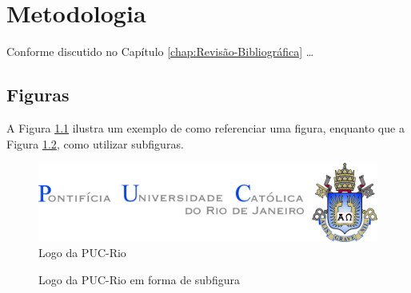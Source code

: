 

\chapter{Metodologia}
\label{chap:Metodologia}

Conforme discutido no Capítulo \ref{chap:Revisão-Bibliográfica} \ldots
\lipsum[1]
\section{Figuras}
\label{sec:Figuras}

A Figura \ref{fig:puc.png} ilustra um exemplo de como referenciar uma figura, 
enquanto que a Figura \ref{fig:puc2}, como utilizar subfiguras.

\begin{figure}[ht]
  \centering
  \includegraphics[scale=1.0]{figs/puc.png}
  \caption{Logo da PUC-Rio}
  \label{fig:puc.png}
 \end{figure}

\begin{figure}[ht]
  \centering
  \hspace{1cm}
  \caption{Logo da PUC-Rio em forma de subfigura}
  \label{fig:puc2}
 \end{figure}

